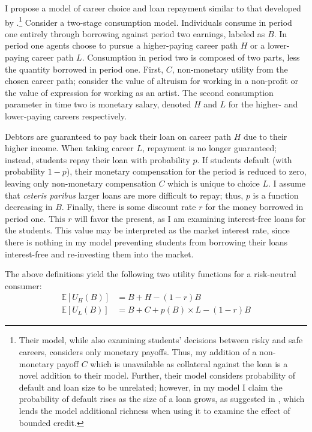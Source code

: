 \documentclass[12pt]{article}
\begin{document}
	I propose a model of career choice and loan repayment similar to that developed by \textcite{abraham2018}.\footnote{Their model, while also examining students' decisions between risky and safe careers, considers only monetary payoffs. Thus, my addition of a non-monetary payoff $C$ which is unavailable as collateral against the loan is a novel addition to their model. Further, their model considers probability of default and loan size to be unrelated; however, in my model I claim the probability of default rises as the size of a loan grows, as suggested in \textcite{dynarski2015}, which lends the model additional richness when using it to examine the effect of bounded credit.} 
	Consider a two-stage consumption model. Individuals consume in period one entirely through borrowing against period two earnings, labeled as $B$. In period one agents choose to pursue a higher-paying career path $H$ or a lower-paying career path $L$. Consumption in period two is composed of two parts, less the quantity borrowed in period one. First, $C$, non-monetary utility from the chosen career path; consider the value of altruism for working in a non-profit or the value of expression for working as an artist. The second consumption parameter in time two is monetary salary, denoted $H$ and $L$ for the higher- and lower-paying careers respectively.
	
	Debtors are guaranteed to pay back their loan on career path $H$ due to their higher income. When taking career $L$, repayment is no longer guaranteed; instead, students repay their loan with probability $p$. If students default (with probability $1 - p$), their monetary compensation for the period is reduced to zero, leaving only non-monetary compensation $C$ which is unique to choice $L$. I assume that \emph{ceteris paribus} larger loans are more difficult to repay; thus, $p$ is a function decreasing in $B$. Finally, there is some discount rate $r$ for the money borrowed in period one. This $r$ will favor the present, as I am examining interest-free loans for the students. This value may be interpreted as the market interest rate, since there is nothing in my model preventing students from borrowing their loans interest-free and re-investing them into the market. 
	
	The above definitions yield the following two utility functions for a risk-neutral consumer: 
	\begin{align}
	\mathbb{E}\left[U_H(B)\right] &= B + H - (1 - r)B \label{highu}\\
	\mathbb{E}\left[U_L(B)\right] &= B + C + p(B) \times L - (1 - r)B \label{lowu}
	\end{align}
	
\end{document}
